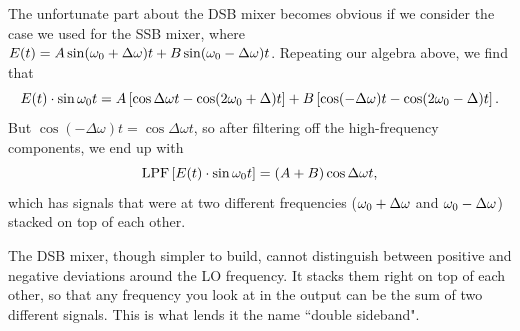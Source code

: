 \documentclass[11pt,preprint]{aastex}
\begin{document}
The unfortunate part about the DSB mixer becomes obvious if we consider the
case we used for the SSB mixer, where $E(t)=A\sin(\omega_0 +\Delta\omega)t + B\sin(\omega_0 -\Delta\omega)t$.
Repeating our algebra above, we find that
\begin{equation}
E(t)\cdot \sin\omega_0 t = 
A\left[\cos\Delta\omega t - \cos(2\omega_0 +\Delta)t\right] +
B\left[\cos(-\Delta\omega) t - \cos(2\omega_0 -\Delta)t\right].
\end{equation}
But $\cos(-\Delta\omega)t=\cos\Delta\omega t$, so after filtering off the high-frequency components,
we end up with
\begin{equation}
{\rm LPF}\left[E(t)\cdot \sin\omega_0 t\right] = (A+B)\cos\Delta\omega t,
\end{equation}
which has signals that were at two different frequencies 
($\omega_0 +\Delta\omega$ and $\omega_0 -\Delta\omega$)
stacked on top of each other.

The DSB mixer, though simpler to build, cannot distinguish between positive and negative deviations around
the LO frequency.  It stacks them right on top of each other, so that any frequency you look at in the output
can be the sum of two different signals.  This is what lends it the name ``double sideband".
\end{document}
